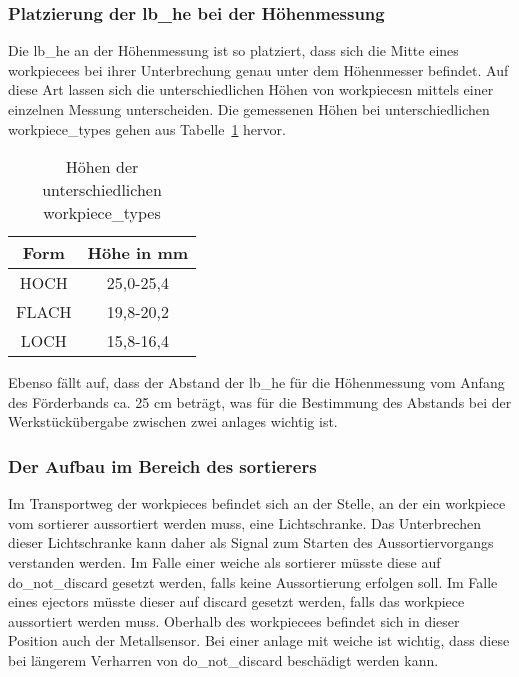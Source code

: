 \subsubsection{Platzierung der \gls{lb_he} bei der Höhenmessung}

Die \gls{lb_he} an der Höhenmessung ist so platziert, dass sich die Mitte eines \Gls{workpiece}es bei ihrer
Unterbrechung genau unter dem Höhenmesser befindet.
Auf diese Art lassen sich die unterschiedlichen Höhen von \Glspl{workpiece}n mittels einer einzelnen Messung unterscheiden.
Die gemessenen Höhen bei unterschiedlichen \glspl{workpiece_type} gehen aus Tabelle~\ref{tab:werkstuecke} hervor.

\begin{table}[h]
    \begin{center}
        \begin{tabular}{ |c|c| }
            \hline
            Form                     & Höhe in mm \\
            \hline\hline
            HOCH                 &  25,0-25,4\\
            \hline
            FLACH                     & 19,8-20,2 \\
            \hline
            LOCH               & 15,8-16,4 \\
            \hline
        \end{tabular}
    \end{center}
    \caption{Höhen der unterschiedlichen \glspl{workpiece_type}}
    \label{tab:werkstuecke}
\end{table}

Ebenso fällt auf, dass der Abstand der \gls{lb_he} für die Höhenmessung vom Anfang des Förderbands ca. 25 cm beträgt,
was für die Bestimmung des Abstands bei der Werkstückübergabe zwischen zwei \glspl{anlage} wichtig ist.

\subsubsection{Der Aufbau im Bereich des \gls{sortierer}s}

Im Transportweg der \Glspl{workpiece} befindet sich an der Stelle, an der ein \Gls{workpiece} vom \gls{sortierer} aussortiert
werden muss, eine Lichtschranke.
Das Unterbrechen dieser Lichtschranke kann daher als Signal zum Starten des Aussortiervorgangs verstanden werden.
Im Falle einer \gls{weiche} als \gls{sortierer} müsste diese auf \gls{do_not_discard} gesetzt werden, falls keine Aussortierung erfolgen soll.
Im Falle eines \Gls{ejector}s müsste dieser auf \gls{discard} gesetzt werden, falls das \Gls{workpiece} aussortiert werden muss.
Oberhalb des \Gls{workpiece}es befindet sich in dieser Position auch der Metallsensor.
Bei einer \gls{anlage} mit \gls{weiche} ist wichtig, dass diese bei längerem Verharren von \gls{do_not_discard} beschädigt werden kann.


